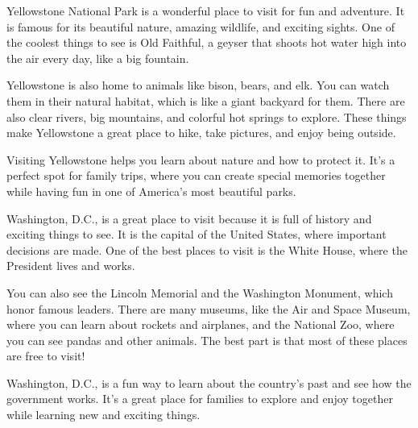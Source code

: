\documentclass[12pt]{article}
\begin{document}
\begin{tcolorbox}[colframe=black!60, colback=white, 
coltitle=black, colbacktitle=black!15, fonttitle=\bfseries\Large, 
title=Source 1: Yellowstone Park, halign title=center, left=10pt, right=10pt, top=10pt, bottom=15pt]
Yellowstone National Park is a wonderful place to visit for fun and adventure. It is famous for its beautiful nature, amazing wildlife, and exciting sights. One of the coolest things to see is Old Faithful, a geyser that shoots hot water high into the air every day, like a big fountain.

Yellowstone is also home to animals like bison, bears, and elk. You can watch them in their natural habitat, which is like a giant backyard for them. There are also clear rivers, big mountains, and colorful hot springs to explore. These things make Yellowstone a great place to hike, take pictures, and enjoy being outside.

Visiting Yellowstone helps you learn about nature and how to protect it. It’s a perfect spot for family trips, where you can create special memories together while having fun in one of America’s most beautiful parks.

 



     \end{tcolorbox}

\vspace{1em}
\begin{tcolorbox}[colframe=black!60, colback=white, 
coltitle=black, colbacktitle=black!15, fonttitle=\bfseries\Large, 
title=Source 2: Washington D.C., halign title=center, left=10pt, right=10pt, top=10pt, bottom=15pt]
Washington, D.C., is a great place to visit because it is full of history and exciting things to see. It is the capital of the United States, where important decisions are made. One of the best places to visit is the White House, where the President lives and works.

You can also see the Lincoln Memorial and the Washington Monument, which honor famous leaders. There are many museums, like the Air and Space Museum, where you can learn about rockets and airplanes, and the National Zoo, where you can see pandas and other animals. The best part is that most of these places are free to visit!

Washington, D.C., is a fun way to learn about the country’s past and see how the government works. It’s a great place for families to explore and enjoy together while learning new and exciting things.

 

 



     \end{tcolorbox}
\end{document}
